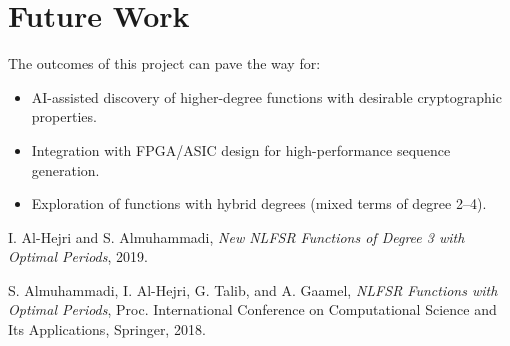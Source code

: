 \documentclass[11pt]{article}
\begin{document}
\section{Future Work}
The outcomes of this project can pave the way for:
\begin{itemize}
    \item AI-assisted discovery of higher-degree functions with desirable cryptographic properties.
    \item Integration with FPGA/ASIC design for high-performance sequence generation.
    \item Exploration of functions with hybrid degrees (mixed terms of degree 2--4).
\end{itemize}

\begin{thebibliography}{9}
I. Al-Hejri and S. Almuhammadi,
\textit{New NLFSR Functions of Degree 3 with Optimal Periods}, 2019.

S. Almuhammadi, I. Al-Hejri, G. Talib, and A. Gaamel,
\textit{NLFSR Functions with Optimal Periods}, Proc. International Conference on Computational Science and Its Applications, Springer, 2018.
\end{thebibliography}
\end{document}
